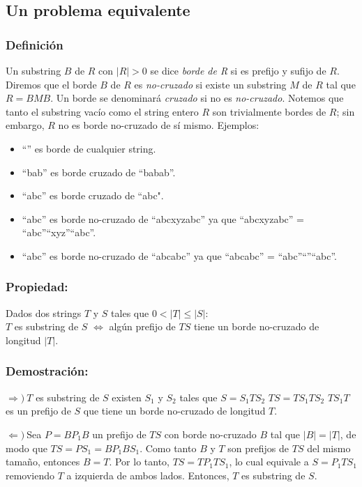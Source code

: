 \subsection{Un problema equivalente}

\subsubsection{Definición}

Un substring $B$ de $R$ con $|R| > 0$ se dice \textit{borde de R} si es prefijo y sufijo de $R$. Diremos que el borde $B$ de $R$ es \textit{no-cruzado} si existe un substring $M$ de $R$ tal que $R = BMB$. Un borde se denominará \textit{cruzado} si no es \textit{no-cruzado}. Notemos que tanto el substring vacío como el string entero $R$ son trivialmente bordes de $R$; sin embargo, $R$ no es borde no-cruzado de sí mismo. Ejemplos:
\begin{itemize}
\item ``'' es borde de cualquier string.
\item ``bab'' es borde cruzado de ``babab''.
\item ``abc'' es borde cruzado de ``abc".
\item ``abc'' es borde no-cruzado de ``abcxyzabc'' ya que ``abcxyzabc'' = ``abc''``xyz''``abc''.
\item ``abc'' es borde no-cruzado de ``abcabc'' ya que ``abcabc'' = ``abc''``''``abc''.
\end{itemize}

\subsubsection{Propiedad:} Dados dos strings $T$ y $S$ tales que $0 < |T| \leq |S|$: \\
$T$ es substring de $S$ $\iff$ algún prefijo de $TS$ tiene un borde no-cruzado de longitud $|T|$.

\subsubsection{Demostración:}

$\Longrightarrow) \ $$T$ es substring de $S$ \spaciousimply existen $S_1$ y $S_2$ tales que $S = S_1 T S_2$ \spaciousimply $TS = T S_1 T S_2$ \spaciousimply $T S_1 T$ es un prefijo de $S$ que tiene un borde no-cruzado de longitud $T$.

$\Longleftarrow) \ $Sea $P = B P_1 B$ un prefijo de $TS$ con borde no-cruzado $B$ tal que $|B| = |T|$, de modo que $TS = P S_1 = B P_1 B S_1$. Como tanto $B$ y $T$ son prefijos de $TS$ del mismo tamaño, entonces $B = T$. Por lo tanto, $TS = T P_1 T S_1$, lo cual equivale a $S = P_1 T S_1$ removiendo $T$ a izquierda de ambos lados. Entonces, $T$ es substring de $S$.

